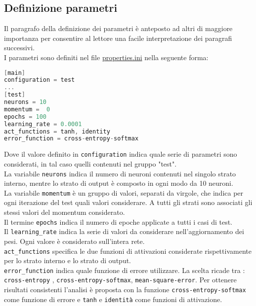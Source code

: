 \subsection{Definizione parametri}
Il paragrafo della definizione dei parametri è anteposto ad altri di maggiore importanza per consentire al lettore una facile interpretazione dei paragrafi successivi. \\
I parametri sono definiti nel file \underline{properties.ini} nella seguente forma:
\begin{lstlisting}[language=C]
[main]
configuration = test
...
[test]
neurons = 10
momentum =  0
epochs = 100
learning_rate = 0.0001
act_functions = tanh, identity
error_function = cross-entropy-softmax
\end{lstlisting}
Dove il valore definito in \texttt{configuration} indica quale serie di parametri sono considerati, in tal caso quelli contenuti nel gruppo "test". \\
La variabile \texttt{neurons} indica il numero di neuroni contenuti nel singolo strato interno, mentre lo strato di output è composto in ogni modo da 10 neuroni.\\
La variabile \texttt{momentum} è un gruppo di valori, separati da virgole, che indica per ogni iterazione del test quali valori considerare. A tutti gli strati sono associati gli stessi valori del momentum considerato. \\
Il termine \texttt{epochs} indica il numero di epoche applicate a tutti i casi di test. \\
Il \texttt{learning\_rate} indica la serie di valori da considerare nell'aggiornamento dei pesi. Ogni valore è considerato sull'intera rete. \\
\texttt{act\_functions} specifica le due funzioni di attivazioni considerate rispettivamente per lo strato interno e lo strato di output. \\
\texttt{error\_function} indica quale funzione di errore utilizzare. La scelta ricade tra : \texttt{cross-entropy} , \texttt{cross-entropy-softmax}, \texttt{mean-square-error}. Per ottenere risultati consistenti l'analisi è proposta con la funzione \texttt{cross-entropy-softmax} come funzione di errore e \texttt{tanh} e \texttt{identità} come funzioni di attivazione.

